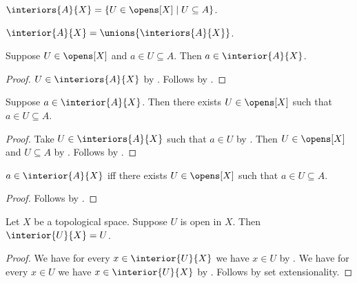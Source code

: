 \begin{definition}[Interiors]\label{interiors}
    $\interiors{A}{X} = \{ U\in\opens[X]\mid U\subseteq A\}$.
\end{definition}

\begin{definition}[Interior]\label{interior}
    $\interior{A}{X} = \unions{\interiors{A}{X}}$.
\end{definition}

\begin{proposition}[Interior]\label{interior_elem_intro}
    Suppose $U\in\opens[X]$ and $a\in U\subseteq A$.
    Then $a\in\interior{A}{X}$.
\end{proposition}
\begin{proof}
    $U\in\interiors{A}{X}$ by .
    Follows by .
\end{proof}

\begin{proposition}[Interior]\label{interior_elem_elim}
    Suppose $a\in\interior{A}{X}$.
    Then there exists $U\in\opens[X]$
    such that $a\in U\subseteq A$.
\end{proposition}
\begin{proof}
    Take $U\in\interiors{A}{X}$ such that $a\in U$
        by .
    Then $U\in\opens[X]$ and $U\subseteq A$ by .
    Follows by \auto.
\end{proof}

\begin{proposition}[Interior]\label{interior_elem_iff}
    $a\in\interior{A}{X}$ iff
    there exists $U\in\opens[X]$
    such that $a\in U\subseteq A$.
\end{proposition}
\begin{proof}
    Follows by .
\end{proof}

\begin{proposition}\label{interior_of_open}
    Let $X$ be a topological space.
    Suppose $U$ is open in $X$.
    Then $\interior{U}{X} = U$.
\end{proposition}
\begin{proof}
    We have for every $x\in\interior{U}{X}$ we have $x\in U$
        by .
    We have for every $x\in U$ we have $x\in\interior{U}{X}$
        by .
    Follows by set extensionality.
\end{proof}

